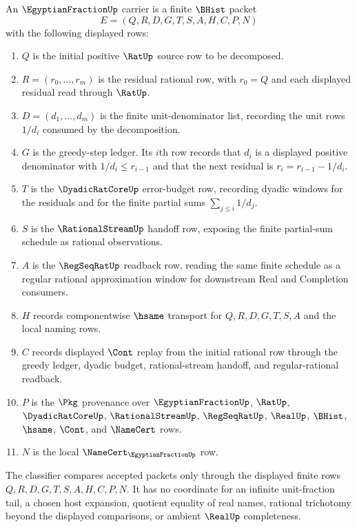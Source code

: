 \begin{definition}
\label{def:egyptian-fraction-carrier}
An $\EgyptianFractionUp$ carrier is a finite $\BHist$ packet
$$
E=(Q,R,D,G,T,S,A,H,C,P,N)
$$
with the following displayed rows:
\begin{enumerate}
\item $Q$ is the initial positive $\RatUp$ source row to be decomposed.
\item $R=(r_0,\ldots,r_m)$ is the residual rational row, with $r_0=Q$ and each displayed residual read through $\RatUp$.
\item $D=(d_1,\ldots,d_m)$ is the finite unit-denominator list, recording the unit rows $1/d_i$ consumed by the decomposition.
\item $G$ is the greedy-step ledger. Its $i$th row records that $d_i$ is a displayed positive denominator with $1/d_i \leq r_{i-1}$ and that the next residual is $r_i=r_{i-1}-1/d_i$.
\item $T$ is the $\DyadicRatCoreUp$ error-budget row, recording dyadic windows for the residuals and for the finite partial sums $\sum_{j\leq i}1/d_j$.
\item $S$ is the $\RationalStreamUp$ handoff row, exposing the finite partial-sum schedule as rational observations.
\item $A$ is the $\RegSeqRatUp$ readback row, reading the same finite schedule as a regular rational approximation window for downstream Real and Completion consumers.
\item $H$ records componentwise $\hsame$ transport for $Q,R,D,G,T,S,A$ and the local naming rows.
\item $C$ records displayed $\Cont$ replay from the initial rational row through the greedy ledger, dyadic budget, rational-stream handoff, and regular-rational readback.
\item $P$ is the $\Pkg$ provenance over $\EgyptianFractionUp$, $\RatUp$, $\DyadicRatCoreUp$, $\RationalStreamUp$, $\RegSeqRatUp$, $\RealUp$, $\BHist$, $\hsame$, $\Cont$, and $\NameCert$ rows.
\item $N$ is the local $\NameCert_{\EgyptianFractionUp}$ row.
\end{enumerate}
The classifier compares accepted packets only through the displayed finite rows $Q,R,D,G,T,S,A,H,C,P,N$. It has no coordinate for an infinite unit-fraction tail, a chosen host expansion, quotient equality of real names, rational trichotomy beyond the displayed comparisons, or ambient $\RealUp$ completeness.
\end{definition}

